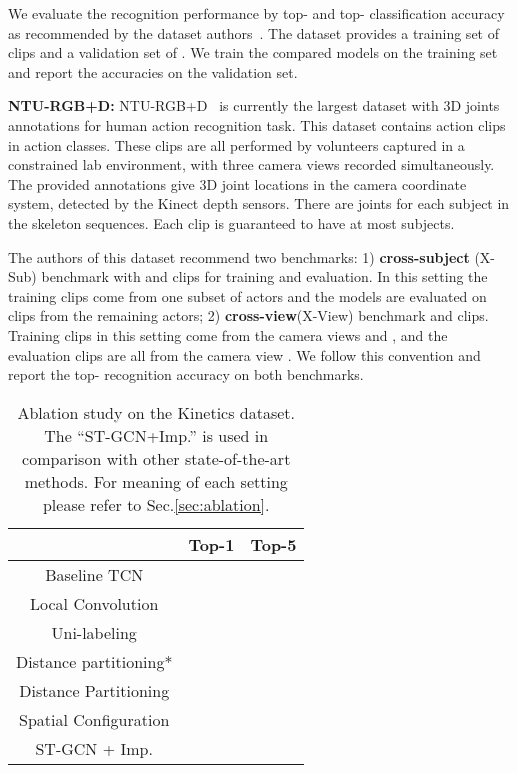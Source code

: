 \documentclass[letterpaper]{article} \usepackage{aaai18}  \usepackage{times}  \usepackage{helvet}  \usepackage{courier}  \usepackage{url}  \usepackage{graphicx}
\begin{document}
We evaluate the recognition performance by  top- and  top- classification accuracy as recommended by the dataset authors~\cite{Kay2017Kinetics}. 
The dataset provides a training set of  clips and a validation set of .
We train the compared models on the training set and report the accuracies on the validation set.


\textbf{NTU-RGB+D:}
NTU-RGB+D~\cite{Shahroudy2016CVPR} is currently the largest dataset with 3D joints annotations for human action recognition task.
This dataset contains  action clips in  action classes.
These clips are all performed by  volunteers captured in a constrained lab environment, with three camera views recorded simultaneously.
The provided annotations give 3D joint locations  in the camera coordinate system, detected by the Kinect depth sensors. 
There are  joints for each subject in the skeleton sequences.
Each clip is guaranteed to have at most  subjects.

The authors of this dataset recommend two benchmarks: 
1) \textbf{cross-subject} (X-Sub) benchmark with  and  clips for training and evaluation. In this setting the training clips come from one subset of actors and the models are evaluated on clips from the remaining actors; 
2) \textbf{cross-view}(X-View) benchmark  and  clips. Training clips in this setting come from the camera views  and , and the evaluation clips are all from the camera view .
We follow this convention and report the top- recognition accuracy on both benchmarks.



\begin{table}
	\centering
	\begin{tabular}{c|c|c}
		\hline
		& Top-1 & Top-5 \\ \hline
		Baseline TCN			& 	 & \\\hline
		Local Convolution	& 	 & \\\hline
		Uni-labeling	& 	& \\
		Distance partitioning*	& 	&  \\
		Distance Partitioning	& &  \\
		Spatial Configuration	& &  \\\hline
		ST-GCN + Imp.					& &  \\\hline
	\end{tabular}
	\caption{Ablation study on the Kinetics dataset. The ``ST-GCN+Imp.'' is used in comparison with other state-of-the-art methods.
		For meaning of each setting please refer to Sec.\ref{sec:ablation}. }\label{tab:ablation}
\end{table}
\end{document}
